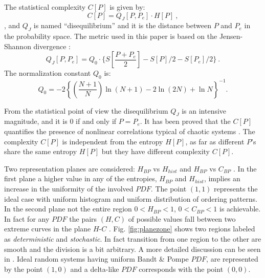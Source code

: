 The statistical complexity $C[P]$ is given by:
\begin{equation}
\label{eq:inten}
C[{P}]=Q_{J}[{P,P_e}]\cdot H[{P}] \ ,
\end{equation}
, and
$Q_{J}$ is named ``disequilibrium'' and it is the distance between $P$ and $P_e$ 
 in the probability space. The metric used in this paper is based on the Jensen-Shannon divergence
 \cite{Lamberti2004}:
\begin{equation}
\label{eq:disequi}
Q_{J}[{P,P_e}]= Q_0 \cdot \{S[\frac{P+P_e}{2}]-S[P]/2-S[P_e]/2 \} \ .
\end{equation}
The normalization constant $Q_0$ is:
\begin{equation}
\label{eq:q0j}
Q_0=-2 \left\{ \left( \frac{N+1}{N} \right) \ln(N+1) - 2 \ln(2N) + \ln N \right\}^{-1} .
\end{equation}

From the statistical point of view the disequilibrium $Q_J$ is an
intensive magnitude, and it is $0$ if and only if $P=P_e$. It has
been proved that the $C[P]$ quantifies the presence of nonlinear
correlations typical of chaotic systems
\cite{Martin2003,Lamberti2004}. The complexity $C[P]$ is
independent from the entropy $H[P]$, as far as different $P$'s share
the same entropy $H[P]$ but they have different  complexity
$C[P]$.

Two representation planes are considered: $H_{BP}$ vs $H_{hist}$ \cite{DeMicco2008} and $H_{BP}$ vs $C_{BP}$ \cite{Rosso2007C}. In the first plane a higher value in any of the entropies,  $H_{BP}$ and $H_{hist}$, implies an increase in the uniformity of the involved $PDF$. The point $(1,1)$ represents the ideal case with uniform histogram and uniform distribution of ordering patterns.  In the second plane not the entire region $0<H_{BP}<1$, $0<C_{BP}<1$ is achievable. In fact for any $PDF$ the pairs $(H,C)$ of possible values fall between two extreme curves in the plane $H$-$C$ \cite{Anteneodo1996}. Fig. \ref{fig:planezone} shows two regions labeled as \textit{deterministic} and \textit{stochastic}. In fact transition from one region to the other are smooth and the division is a bit arbitrary. A more detailed discussion can be seen in \cite{Rosso2007C}. Ideal random systems having uniform Bandt \& Pompe $PDF$, are represented by the point $(1,0)$ \cite{Gonzalez2005} and a delta-like $PDF$ corresponds with the point $(0,0)$. 
